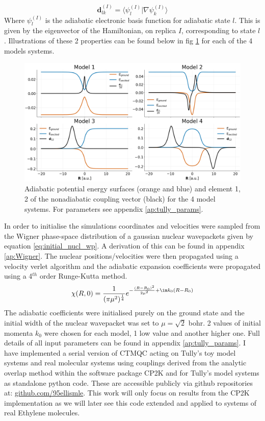 \begin{equation}
  \mathbf{d}_{lk}^{(I)} = \langle \psi_{l}^{(I)} | \nabla \psi_k^{(I)} \rangle
  \label{eq:NACV_def}
\end{equation}
Where $\psi_{l}^{(I)}$ is the adiabatic electronic basis function for adiabatic state $l$. This is given by the eigenvector of the Hamiltonian, on replica $I$, corresponding to state $l$. Illustrations of these 2 properties can be found below in fig \ref{fig:tully_schematics} for each of the 4 models systems.
\begin{figure}[H]
  \includegraphics[width=\textwidth]{../Chapter_tullyModels/model_schematics.png}
  \caption{\label{fig:tully_schematics}Adiabatic potential energy surfaces (orange and blue) and element 1, 2 of the nonadiabatic coupling vector (black) for the 4 model systems. For parameters see appendix \ref{ap:tully_params}.}
\end{figure}
\newpage
\noindent In order to initialise the simulations coordinates and velocities were sampled from the Wigner phase-space distribution of a gaussian nuclear wavepackets given by equation \eqref{eq:initial_nucl_wp}. A derivation of this can be found in appendix \ref{ap:Wigner}. The nuclear positions/velocities were then propagated using a velocity verlet algorithm and the adiabatic expansion coefficients were propagated using a 4$^{th}$ order Runge-Kutta method.
\begin{equation}
  \chi(R, 0) = \frac{1}{(\pi \mu^2)^{\frac{1}{4}}} e^{-\frac{(R - R_0)^2}{2 \mu^2} + \im k_0 (R - R_0) }
  \label{eq:initial_nucl_wp}
\end{equation}
The adiabatic coefficients were initialised purely on the ground state and the initial width of the nuclear wavepacket was set to $\mu = \sqrt{2}$ bohr. 2 values of initial momenta $k_0$ were chosen for each model, 1 low value and another higher one. Full details of all input parameters can be found in appendix \ref{ap:tully_params}. I have implemented a serial version of CTMQC acting on Tully's toy model systems and real molecular systems using couplings derived from the analytic overlap method \cite{gajdos_ultrafast_2014} within the software package CP2K \cite{cp2k} and for Tully's model systems as standalone python code. These are accessible publicly via github repositories at: \href{https://github.com/95ellismle}{github.com/95ellismle}. This work will only focus on results from the CP2K implementation as we will later see this code extended and applied to systems of real Ethylene molecules.

